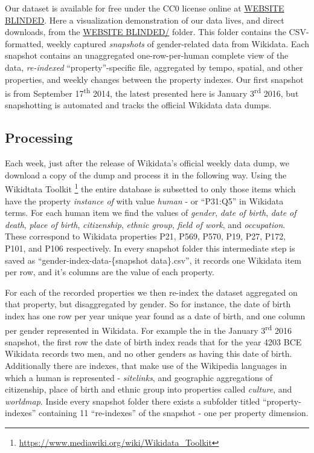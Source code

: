 \documentclass[letterpaper]{article}
\begin{document}
Our dataset is available for free under the CC0 license online at  \url{WEBSITE BLINDED}. Here a visualization demonstration of our data lives, and direct downloads, from the \url{WEBSITE BLINDED/} folder. 	This folder contains the CSV-formatted, weekly captured \textit{snapshots} of gender-related data from Wikidata. Each snapshot contains an unaggregated one-row-per-human complete view of the data, \textit{re-indexed} ``property''-specific file, aggregated by tempo, spatial, and other properties, and weekly changes between the property indexes. Our first snapshot is from September 17\textsuperscript{th} 2014, the latest presented here is January 3\textsuperscript{rd} 2016, but snapshotting is automated and tracks the official Wikidata data dumps.

\subsection{Processing}
Each week, just after the release of Wikidata's official weekly data dump, we download a copy of the dump and process it in the following way. Using the Wikidtata Toolkit \footnote{\url{https://www.mediawiki.org/wiki/Wikidata_Toolkit}} the entire database is subsetted to only those items which have the property \textit{instance of} with value \textit{human} - or ``P31:Q5'' in Wikidata terms. For each human item we find the values of \textit{gender}, \textit{date of birth}, \textit{date of death}, \textit{place of birth}, \textit{citizenship}, \textit{ethnic group}, \textit{field of work}, and \textit{occupation}. These correspond to Wikidata properties P21, P569, P570, P19, P27, P172, P101, and P106 respectively.  In every snapshot folder this intermediate step is saved as ``gender-index-data-\{snapshot data\}.csv'', it records one Wikidata item per row, and it's columns are the value of each property.
 
For each of the recorded properties we then re-index the dataset aggregated on that property, but disaggregated by gender. So for instance, the date of birth index has one row per year unique year found as a date of birth, and one column per gender represented in Wikidata. For example the in the January 3\textsuperscript{rd} 2016 snapshot, the first row the date of birth index reads that for the year 4203 BCE Wikidata records two men, and no other genders as having this date of birth. Additionally there are indexes, that make use of the Wikipedia languages in which a human is represented - \textit{sitelinks}, and geographic aggregations of citizenship, place of birth and ethnic group into properties called \textit{culture}, and \textit{worldmap}. Inside every snapshot folder there exists a subfolder titled ``property-indexes'' containing 11 ``re-indexes'' of the snapshot - one per property dimension.
 
\end{document}
